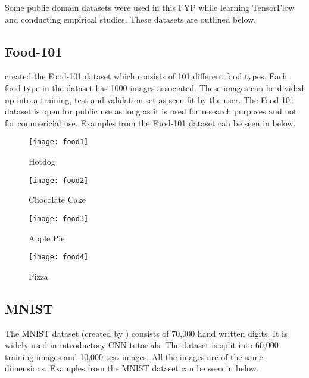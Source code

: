 Some public domain datasets were used in this FYP while learning TensorFlow and conducting empirical studies.
These datasets are outlined below.
\subsection*{Food-101}
\parencite{food101} created the Food-101 dataset which consists of 101 different food types.
Each food type in the dataset has 1000 images associated.
These images can be divided up into a training, test and validation set as seen fit by the user.
The Food-101 dataset is open for public use as long as it is used for research purposes and not for commericial use.
Examples from the Food-101 dataset can be seen in below.

\begin{figure}[h] 
  \label{food} 
  \begin{minipage}[b]{0.25\linewidth}
    \centering
    \texttt{[image: food1]} 
    \caption{Hotdog} 
    \vspace{4ex}
  \end{minipage}%
  \begin{minipage}[b]{0.25\linewidth}
    \centering
    \texttt{[image: food2]} 
    \caption{Chocolate Cake} 
  \label{fig:page2}
    \vspace{4ex}
  \end{minipage} 
  \begin{minipage}[b]{0.25\linewidth}
    \centering
    \texttt{[image: food3]} 
    \caption{Apple Pie} 
    \vspace{4ex}
  \end{minipage}%
  \begin{minipage}[b]{0.25\linewidth}
    \centering
    \texttt{[image: food4]} 
    \caption{Pizza} 
    \vspace{4ex}
  \end{minipage} 
\end{figure}

\subsection*{MNIST}
The MNIST dataset (created by \parencite{mnist}) consists of 70,000 hand written digits.
It is widely used in introductory CNN tutorials.
The dataset is split into 60,000 training images and 10,000 test images.
All the images are of the same dimensions.
Examples from the MNIST dataset can be seen in below.


